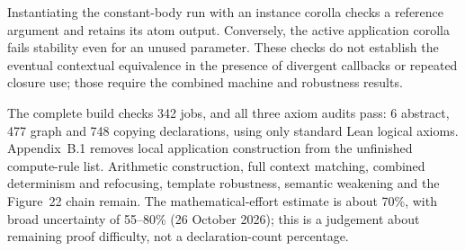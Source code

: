 





Instantiating the constant-body run with an instance corolla checks a
reference argument and retains its atom output. Conversely, the active
application corolla fails stability even for an unused parameter. These
checks do not establish the eventual contextual equivalence in the presence
of divergent callbacks or repeated closure use; those require the combined
machine and robustness results.



The complete build checks 342 jobs, and all three axiom audits pass:
6 abstract, 477 graph and 748 copying declarations, using only standard Lean
logical axioms. Appendix~B.1 removes local application construction from the
unfinished compute-rule list. Arithmetic construction, full context matching,
combined determinism and refocusing, template robustness, semantic weakening
and the Figure~22 chain remain. The mathematical-effort estimate is about
70\%, with broad uncertainty of 55--80\% (26 October 2026); this is a judgement
about remaining proof difficulty, not a declaration-count percentage.

